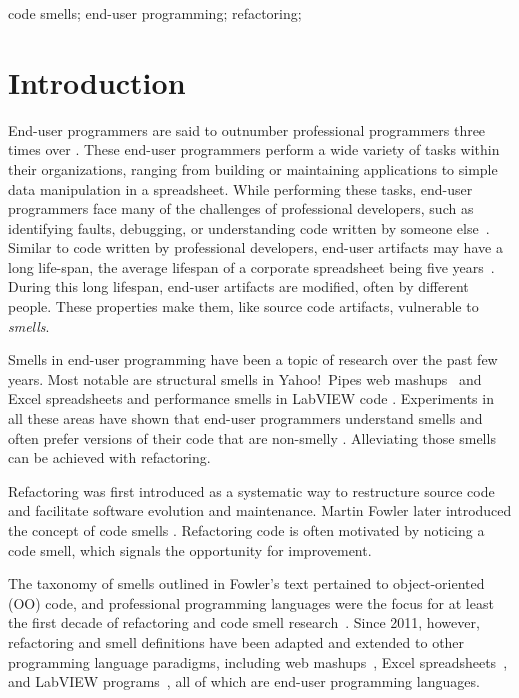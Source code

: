 \documentclass[10pt,conference,compsocconf]{IEEEtran}
\begin{document}
\begin{IEEEkeywords}
code smells;
end-user programming;
refactoring;
\end{IEEEkeywords}

\section{Introduction}
End-user programmers are said to outnumber  professional programmers three times over \cite{Scaf2005}.
These end-user programmers perform a wide variety of tasks within their organizations, ranging from building or maintaining applications to simple data manipulation in a spreadsheet.
While performing these tasks, end-user programmers face many of the challenges of professional developers, such as identifying faults, debugging, or understanding code written by someone else~\cite{Ko2011}.
Similar to code written by professional developers, end-user artifacts may have a long life-span, the average lifespan of a corporate spreadsheet being five years~\cite{Hermans2011}.
During this long lifespan, end-user artifacts are modified, often by different people.
These properties make them, like source code artifacts, vulnerable to \emph{smells}. 

Smells in end-user programming have been a topic of research over the past few years. Most notable are structural smells in Yahoo!\ Pipes web mashups~\cite{Stolee2011} and  Excel spreadsheets \cite{Hermans2012inter} and performance smells in LabVIEW code \cite{chambers2013smell}.
Experiments in all these areas have shown that end-user programmers understand smells and often prefer versions of their code that are non-smelly \cite{Hermans2012intra, StoleeTSE2013, chambers2013smell}.
Alleviating those smells can be achieved with refactoring.

Refactoring was first introduced as a systematic way to restructure source code and facilitate software evolution and maintenance. Martin Fowler later introduced the concept of code smells \cite{Fowl1999}. 
Refactoring code is often motivated by noticing a code smell, which signals the opportunity for improvement.

The taxonomy of smells outlined in Fowler's text pertained  to object-oriented (OO) code, and professional programming languages were the focus for at least the first decade of refactoring and code smell research~\cite{Mens:2004:SSR:972215.972286}.
Since 2011, however, refactoring and smell definitions have been adapted and extended to other 
programming language paradigms, including web mashups~\cite{Stolee2011, StoleeTSE2013}, Excel spreadsheets~\cite{Hermans2011, Hermans2012inter, hermans2014bumblebee}, and LabVIEW programs~\cite{chambers2013smell}, all of which are end-user programming languages. 
\end{document}
